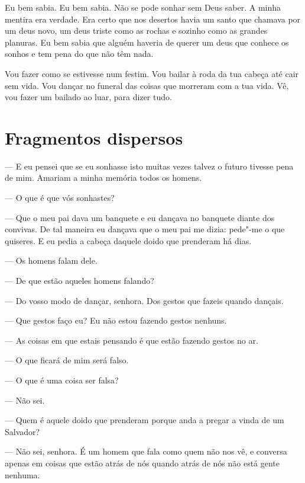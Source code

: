  Eu bem sabia. Eu bem sabia. Não se pode sonhar sem Deus
saber. A minha mentira era verdade. Era certo que nos desertos havia
um santo que chamava por um deus novo, um deus triste como as rochas
e sozinho como as grandes planuras. Eu bem sabia que alguém haveria
de querer um deus que conhece os sonhos e tem pena do que não têm
nada.

Vou fazer como se estivesse num festim. Vou bailar à roda da tua
cabeça até cair sem vida. Vou dançar no funeral das coisas que
morreram com a tua vida. Vê, vou fazer um bailado ao luar, para dizer
tudo.

\section{Fragmentos dispersos}

--- E eu pensei que se eu sonhasse isto muitas vezes talvez o futuro
tivesse pena de mim. Amariam a minha memória todos os homens.

--- O que é que vós sonhastes?

--- Que o meu pai dava um banquete e eu dançava no banquete diante dos
convivas. De tal maneira eu dançava que o meu pai me dizia: pede"-me o
que quiseres. E eu pedia a cabeça daquele doido que prenderam há
dias.

--- Os homens falam dele.

--- De que estão aqueles homens falando?

--- Do vosso modo de dançar, senhora. Dos gestos que fazeis quando
dançais.

--- Que gestos faço eu? Eu não estou fazendo gestos nenhuns.

--- As coisas em que estais pensando é que estão fazendo gestos no ar.

\endgroup

\asterisc 

\begingroup
\linenumbers

--- O que ficará de mim será falso. 

--- O que é uma coisa ser falsa? 

--- Não sei.

\endgroup

\asterisc 

\begingroup
\linenumbers

--- Quem é aquele doido que prenderam porque anda a pregar a vinda de
um Salvador?

--- Não sei, senhora. É um homem que fala como quem não nos vê, e
conversa apenas em coisas que estão atrás de nós quando atrás de nós
não está gente nenhuma.

